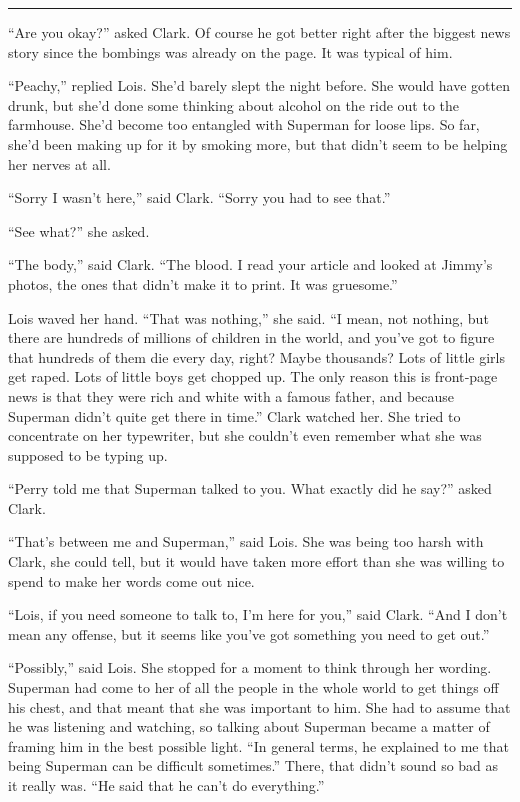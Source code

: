 \documentclass[ebook,12pt]{memoir}
\begin{document}
\begin{center}\rule{0.5\linewidth}{0.5pt}\end{center}

``Are you okay?'' asked Clark. Of course he got better right after the
biggest news story since the bombings was already on the page. It was
typical of him.

``Peachy,'' replied Lois. She'd barely slept the night before. She would
have gotten drunk, but she'd done some thinking about alcohol on the
ride out to the farmhouse. She'd become too entangled with Superman for
loose lips. So far, she'd been making up for it by smoking more, but
that didn't seem to be helping her nerves at all.

``Sorry I wasn't here,'' said Clark. ``Sorry you had to see that.''

``See what?'' she asked.

``The body,'' said Clark. ``The blood. I read your article and looked at
Jimmy's photos, the ones that didn't make it to print. It was
gruesome.''

Lois waved her hand. ``That was nothing,'' she said. ``I mean, not
nothing, but there are hundreds of millions of children in the world,
and you've got to figure that hundreds of them die every day, right?
Maybe thousands? Lots of little girls get raped. Lots of little boys get
chopped up. The only reason this is front‐page news is that they were
rich and white with a famous father, and because Superman didn't quite
get there in time.'' Clark watched her. She tried to concentrate on her
typewriter, but she couldn't even remember what she was supposed to be
typing up.

``Perry told me that Superman talked to you. What exactly did he say?''
asked Clark.

``That's between me and Superman,'' said Lois. She was being too harsh
with Clark, she could tell, but it would have taken more effort than she
was willing to spend to make her words come out nice.

``Lois, if you need someone to talk to, I'm here for you,'' said Clark.
``And I don't mean any offense, but it seems like you've got something
you need to get out.''

``Possibly,'' said Lois. She stopped for a moment to think through her
wording. Superman had come to her of all the people in the whole world
to get things off his chest, and that meant that she was important to
him. She had to assume that he was listening and watching, so talking
about Superman became a matter of framing him in the best possible
light. ``In general terms, he explained to me that being Superman can be
difficult sometimes.'' There, that didn't sound so bad as it really was.
``He said that he can't do everything.''
\end{document}
